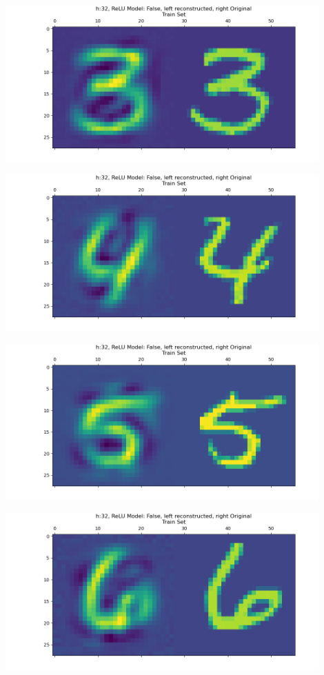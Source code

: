 \documentclass[]{article}
\begin{document}
            \begin{center}
                \includegraphics*[width=12cm]{./A4plots/06-39-49-h-32-lin-digit-3.png}
            \end{center}
            \begin{center}
                \includegraphics*[width=12cm]{./A4plots/06-39-49-h-32-lin-digit-4.png}
            \end{center}
            \begin{center}
                \includegraphics*[width=12cm]{./A4plots/06-39-49-h-32-lin-digit-5.png}
            \end{center}
            \begin{center}
                \includegraphics*[width=12cm]{./A4plots/06-39-49-h-32-lin-digit-6.png}
            \end{center}
\end{document}
